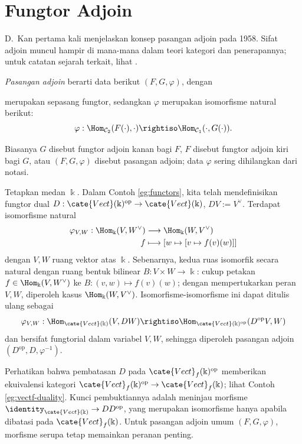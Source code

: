 \section{Fungtor Adjoin}\label{sec:adjoint-functor}
D.\ Kan pertama kali menjelaskan konsep pasangan adjoin pada 1958. Sifat adjoin muncul hampir di mana-mana dalam teori kategori dan penerapannya; untuk catatan sejarah terkait, lihat \cite[p.107]{ML98}.
\begin{definition}\label{def:adjunction-pair} 
	\emph{Pasangan adjoin} berarti data berikut $(F, G, \varphi)$, dengan
	merupakan sepasang fungtor, sedangkan $\varphi$ merupakan isomorfisme natural berikut:
	\[ \varphi: \Hom_{\mathcal{C}_2}(F(\cdot), \cdot) \rightiso \Hom_{\mathcal{C}_1}(\cdot, G(\cdot)). \]
\end{definition}
Biasanya $G$ disebut fungtor adjoin kanan bagi $F$, $F$ disebut fungtor adjoin kiri bagi $G$, atau $(F, G, \varphi)$ disebut pasangan adjoin; data $\varphi$ sering dihilangkan dari notasi.

\begin{example}
	Tetapkan medan $\Bbbk$. Dalam Contoh \ref{eg:functors}, kita telah mendefinisikan fungtor dual $D: \cate{Vect}(\Bbbk)^\text{op} \to \cate{Vect}(\Bbbk)$, $DV := V^\vee$. Terdapat isomorfisme natural
	\begin{align*}
		\varphi_{V, W}: \Hom_\Bbbk(V,  W^\vee) & \longrightarrow \Hom_\Bbbk(W, V^\vee) \\
		f & \longmapsto \left[ w \mapsto [v \mapsto f(v)(w)] \right]
	\end{align*}
	dengan $V, W$ ruang vektor atas $\Bbbk$. Sebenarnya, kedua ruas isomorfik secara natural dengan ruang bentuk bilinear $B: V \times W \to \Bbbk$: cukup petakan $f \in \Hom_\Bbbk(V,  W^\vee)$ ke $B: (v, w) \mapsto f(v)(w)$; dengan mempertukarkan peran $V, W$, diperoleh kasus $\Hom_\Bbbk(W, V^\vee)$. Isomorfisme-isomorfisme ini dapat ditulis ulang sebagai
	\[ \varphi_{V,W} : \Hom_{\cate{Vect}(\Bbbk)}(V, DW) \rightiso \Hom_{\cate{Vect}(\Bbbk)^\text{op}}(D^\text{op}V, W) \]
	dan bersifat fungtorial dalam variabel $V,W$, sehingga diperoleh pasangan adjoin $(D^\text{op}, D, \varphi^{-1})$.
\end{example}

Perhatikan bahwa pembatasan $D$ pada $\cate{Vect}_f(\Bbbk)^\text{op}$ memberikan ekuivalensi kategori $\cate{Vect}_f(\Bbbk)^\text{op} \to \cate{Vect}_f(\Bbbk)$; lihat Contoh \ref{eg:vectf-duality}. Kunci pembuktiannya adalah meninjau morfisme $\identity_{\cate{Vect}(\Bbbk)} \to DD^\text{op}$, yang merupakan isomorfisme hanya apabila dibatasi pada $\cate{Vect}_f(\Bbbk)$. Untuk pasangan adjoin umum $(F, G, \varphi)$, morfisme serupa tetap memainkan peranan penting.

